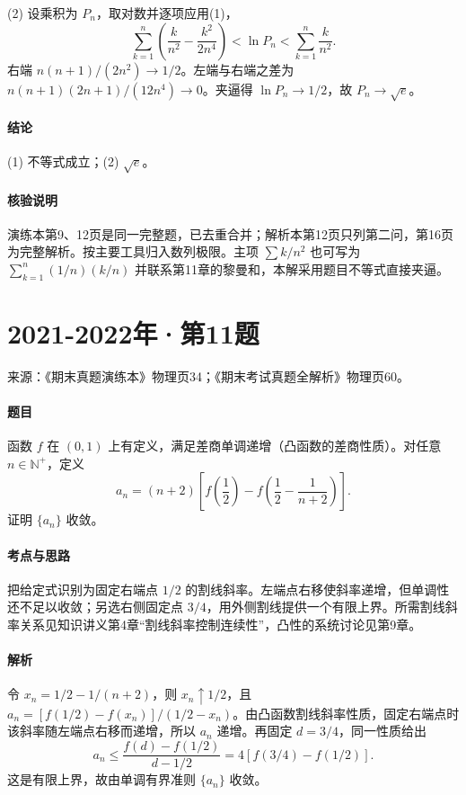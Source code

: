 \documentclass[UTF8,fontset=fandol,12pt,oneside,openany]{ctexrep}
\theoremstyle{definition}
\begin{document}
(2) 设乘积为 $P_n$，取对数并逐项应用(1)，\[
\sum_{k=1}^n\left(\frac{k}{n^2}-\frac{k^2}{2n^4}\right)<\ln P_n<\sum_{k=1}^n\frac{k}{n^2}.
\]右端 $n(n+1)/(2n^2)\to1/2$。左端与右端之差为 $n(n+1)(2n+1)/(12n^4)\to0$。夹逼得 $\ln P_n\to1/2$，故 $P_n\to\sqrt e$。

\paragraph{结论}
(1) 不等式成立；(2) $\sqrt e$。

\paragraph{核验说明}
演练本第9、12页是同一完整题，已去重合并；解析本第12页只列第二问，第16页为完整解析。按主要工具归入数列极限。主项 $\sum k/n^2$ 也可写为 $\sum_{k=1}^n(1/n)(k/n)$ 并联系第11章的黎曼和，本解采用题目不等式直接夹逼。

\par\addvspace{18pt}\noindent\begin{minipage}{\linewidth}
\section{2021-2022年·第11题}
\noindent 来源：《期末真题演练本》物理页34；《期末考试真题全解析》物理页60。

\paragraph{题目}
函数 $f$ 在 $(0,1)$ 上有定义，满足差商单调递增（凸函数的差商性质）。对任意 $n\in\mathbb N^+$，定义
\[
a_n=(n+2)\left[f\left(\frac12\right)-f\left(\frac12-\frac1{n+2}\right)\right].
\]
证明 $\{a_n\}$ 收敛。
\end{minipage}\par
\paragraph{考点与思路}
把给定式识别为固定右端点 $1/2$ 的割线斜率。左端点右移使斜率递增，但单调性还不足以收敛；另选右侧固定点 $3/4$，用外侧割线提供一个有限上界。所需割线斜率关系见知识讲义第4章“割线斜率控制连续性”，凸性的系统讨论见第9章。

\paragraph{解析}
令 $x_n=1/2-1/(n+2)$，则 $x_n\uparrow1/2$，且 $a_n=[f(1/2)-f(x_n)]/(1/2-x_n)$。由凸函数割线斜率性质，固定右端点时该斜率随左端点右移而递增，所以 $a_n$ 递增。再固定 $d=3/4$，同一性质给出
\[
a_n\le\frac{f(d)-f(1/2)}{d-1/2}=4[f(3/4)-f(1/2)].
\]
这是有限上界，故由单调有界准则 $\{a_n\}$ 收敛。
\end{document}
